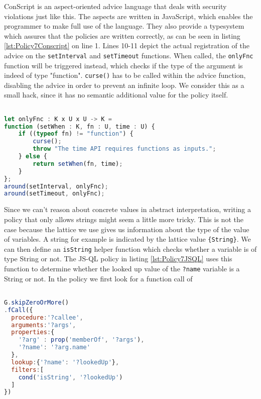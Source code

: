 ConScript is an aspect-oriented advice language that deals with security violations just like this. The aspects are written in JavaScript, which enables the programmer to make full use of the language. They also provide a typesystem which assures that the policies are written correctly, as can be seen in listing \ref{lst:Policy7Conscript} on line 1. Lines 10-11 depict the actual registration of the advice on the \texttt{setInterval} and \texttt{setTimeout} functions. When called, the \texttt{onlyFnc} function will be triggered instead, which checks if the type of the argument is indeed of type "function". \texttt{curse()} has to be called within the advice function, disabling the advice in order to prevent an infinite loop. We consider this as a small hack, since it has no semantic additional value for the policy itself.

\begin{lstlisting}[label={lst:Policy7Conscript},language=JavaScript,caption=Policy 7 in ConScript,mathescape=true]  % float=t?

let onlyFnc : K x U x U -> K =
function (setWhen : K, fn : U, time : U) {
    if ((typeof fn) != "function") {
        curse();
        throw "The time API requires functions as inputs.";
    } else {
        return setWhen(fn, time);
    }
};
around(setInterval, onlyFnc); 
around(setTimeout, onlyFnc);
\end{lstlisting}

Since we can't reason about concrete values in abstract interpretation, writing a policy that only allows strings might seem a little more tricky. This is not the case because the lattice we use gives us information about the type of the value of variables. A string for example is indicated by the lattice value \texttt{\{String\}}. We can then define an \texttt{isString} helper function which checks whether a variable is of type String or not. The JS-QL policy in listing \ref{lst:Policy7JSQL} uses this function to determine whether the looked up value of the \texttt{?name} variable is a String or not. In the policy we first look for a function call of 

\begin{lstlisting}[label={lst:Policy7JSQL},language=JavaScript,caption=Policy 7 in JS-QL,mathescape=true]  % float=t?

G.skipZeroOrMore()
.fCall({
  procedure:'?callee',
  arguments:'?args',
  properties:{
    '?arg' : prop('memberOf', '?args'),
    '?name': '?arg.name'
  },
  lookup:{'?name': '?lookedUp'},
  filters:[
    cond('isString', '?lookedUp')
  ]
})
\end{lstlisting}

